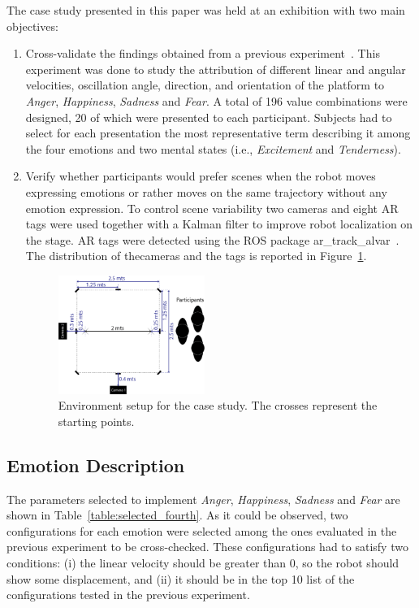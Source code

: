  The case study presented in this paper was held at an exhibition with two main objectives:
\begin{enumerate}
	\item Cross-validate the findings obtained from a previous experiment~\cite{Angel2017-2}. This experiment was done to study the attribution of different linear and angular velocities, oscillation angle, direction, and orientation of the platform to \textit{Anger}, \textit{Happiness}, \textit{Sadness} and \textit{Fear}. A total of 196 value combinations were designed, 20 of which were presented to each participant. Subjects had to select for each presentation the most representative term describing it among the four emotions and two mental states (i.e., \textit{Excitement} and \textit{Tenderness}).
	\item Verify whether participants would prefer scenes when the robot moves expressing emotions or rather moves on the same trajectory without any emotion expression. To control scene variability two cameras and eight AR tags were used together with a Kalman filter to improve robot localization on the stage. AR tags were detected using the ROS package ar\_track\_alvar~\cite{artag2015}. The distribution of thecameras and the tags is reported in Figure~\ref{fig:setup_fourth}. 

\begin{figure}
	\centering
	\includegraphics[width=0.45\textwidth]{./Images/FourthCase.png} 
	\caption{Environment setup for the case study. The crosses represent the starting points.}
	\label{fig:setup_fourth}
\end{figure}
 
\end{enumerate}

\subsection{Emotion Description}

The parameters selected to implement \textit{Anger}, \textit{Happiness}, \textit{Sadness} and \textit{Fear} are shown in Table~\ref{table:selected_fourth}. As it could be observed, two configurations for each emotion were selected among the ones evaluated in the previous experiment to be cross-checked. These configurations had to satisfy two conditions: (i) the linear velocity should be greater than $0$, so the robot should show some displacement, and (ii) it should be in the top 10 list of the configurations tested in the previous experiment.


